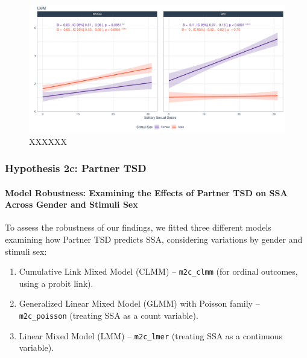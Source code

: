 \documentclass[
  bookmarksnumbered]{article}
\providecommand{\tightlist}{%
  \setlength{\itemsep}{0pt}\setlength{\parskip}{0pt}}
\begin{document}
\begin{figure}
\centering
\includegraphics{Sexual_Desire_Arousal_V2_files/figure-latex/fig-h2b-1.pdf}
\caption{\label{fig:fig-h2b}XXXXXX}
\end{figure}

\subsubsection{Hypothesis 2c: Partner TSD}\label{hyp2c}

\paragraph{Model Robustness: Examining the Effects of Partner TSD on SSA Across Gender and Stimuli Sex}\label{model-robustness-examining-the-effects-of-partner-tsd-on-ssa-across-gender-and-stimuli-sex}

To assess the robustness of our findings, we fitted three different models examining how Partner TSD predicts SSA, considering variations by gender and stimuli sex:

\begin{enumerate}
\def\labelenumi{\arabic{enumi}.}
\tightlist
\item
  Cumulative Link Mixed Model (CLMM) -- \texttt{m2c\_clmm} (for ordinal outcomes, using a probit link).
\item
  Generalized Linear Mixed Model (GLMM) with Poisson family -- \texttt{m2c\_poisson} (treating SSA as a count variable).
\item
  Linear Mixed Model (LMM) -- \texttt{m2c\_lmer} (treating SSA as a continuous variable).
\end{enumerate}
\end{document}
